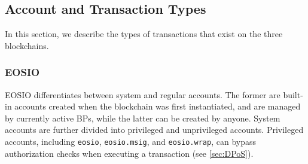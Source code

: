 














\subsection{Account and Transaction Types}
In this section, we describe the types of transactions that exist on the three blockchains.

\subsubsection{EOSIO}
EOSIO differentiates between system and regular accounts.
The former are built-in accounts created when the blockchain was first instantiated, and are managed by currently active BPs, while the latter can be created by anyone.
System accounts are further divided into privileged and unprivileged accounts.
Privileged accounts, including \texttt{eosio}, \texttt{eosio.msig}, and \texttt{eosio.wrap}, can bypass authorization checks when executing a transaction \cite{EOSIO2019, Kauffman2019} (see \autoref{sec:DPoS}).

